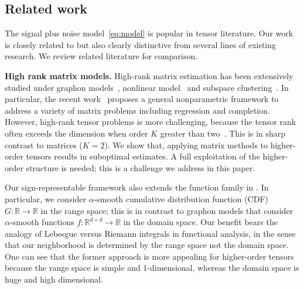\documentclass[twoside,11pt]{article}
\theoremstyle{plain}
\theoremstyle{definition}
\begin{document}
\subsection{Related work}
The signal plus noise model~\eqref{eq:model} is popular in tensor literature. Our work is closely related to but also clearly distinctive from several lines of existing research. We review related literature for comparison.





{\bf High rank matrix models.} High-rank matrix estimation has been extensively studied under graphon models~\citep{xu2018rates}, nonlinear model~\citep{ganti2015matrix} and subspace clustering~\citep{pmlr-v70-ongie17a,fan2019online}. In particular, the recent work~\citep{lee2021nonparametric} proposes a general nonparametric framework to address a variety of matrix problems including regression and completion.
However, high-rank tensor problems is more challenging, because the tensor rank often exceeds the dimension when order $K$ greater than two~\citep{anandkumar2017analyzing}. This is in sharp contrast to matrices ($K=2$). We show that, applying
matrix methods to higher-order tensors results in suboptimal estimates. A full exploitation of the
higher-order structure is needed; this is a challenge we address in this paper.

Our sign-representable framework also extends the function family in \cite{xu2018rates}. In particular, we consider $\alpha$-smooth cumulative distribution function (CDF) $G
\colon\mathbb{R}\rightarrow\mathbb{R}$ in the range space; this is in contrast to graphon models that consider $\alpha$-smooth functions $f\colon \mathbb{R}^{d\times d}\rightarrow \mathbb{R}$  in the domain space. Our benefit bears the analogy of Lebesgue versus Riemann integrals in functional analysis, in the sense that our neighborhood is determined by the range space not the domain space. One can see that the former approach is more appealing for higher-order tensors because the range space is simple and 1-dimensional, whereas the domain space is huge and high dimensional.
\end{document}
